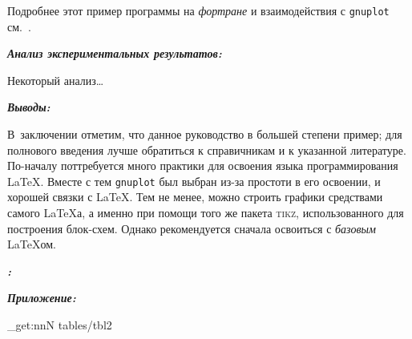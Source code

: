 Подробнее этот пример программы на \textsl{фортране} и взаимодействия с \texttt{gnuplot} см.~\cite{shnejvajs:book:2016:01}.




{\bfseries\itshape Анализ экспериментальных результатов:}
\label{sec:experimental_result_analysis}
Некоторый анализ\ldots




{\bfseries\itshape Выводы:}
\label{sec:conclusions}
В заключении отметим, что данное руководство в большей степени пример; для полнового введения лучше обратиться к справичникам и к указанной литературе. По-началу поттребуется много практики для освоения языка программирования \LaTeX. Вместе с тем \texttt{gnuplot} был выбран из-за простоти в его освоении, и хорошей связки с \LaTeX. Тем не менее, можно строить графики средствами самого \LaTeX а, а именно при помощи того же пакета \textsc{tikz}, использованного для построения блок-схем. Однако рекомендуется сначала освоиться с \textsl{базовым} \LaTeX ом.




{\bfseries\itshape \refname:}
\label{sec:references}
%
%




\newpage

{\bfseries\itshape Приложение:}
\label{sec:application}


\ExplSyntaxOn
\file_get:nnN {tables/tbl2} {\ExplSyntaxOff} \tbltwo
\ExplSyntaxOff


